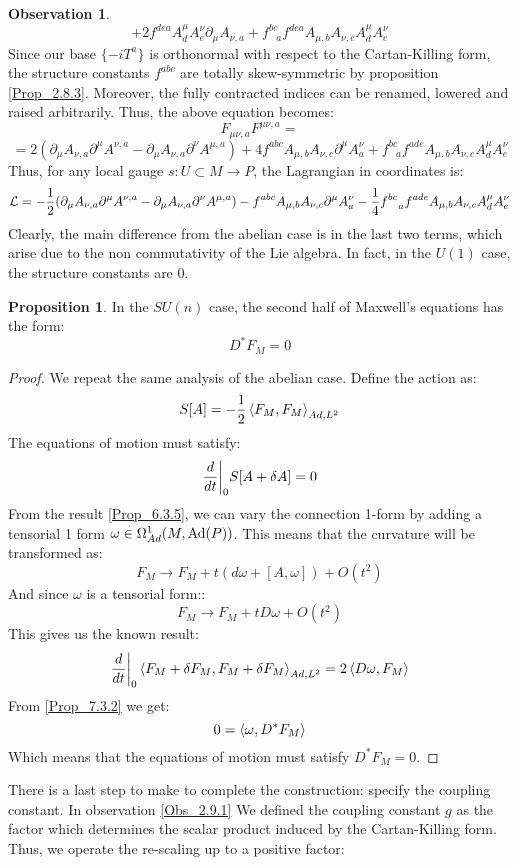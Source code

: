 \documentclass[12pt,a4paper]{report}
\theoremstyle{definition}
\theoremstyle{Theorem}
\newtheorem{Prop}[Def]{Proposition}
\theoremstyle{definition}
\theoremstyle{definition}
\newtheorem{Obs}[Def]{Observation}
\begin{document}
\begin{Obs}
		$$+2f^{dea}A^{\mu}_dA^{\nu}_e\partial_\mu A_{\nu,a}+f^{bc}_{\hspace{9pt}a}f^{dea}A_{\mu,b}A_{\nu,c}A^{\mu}_dA^{\nu}_e$$
		Since our base $\{-iT^a\}$ is orthonormal with respect to the Cartan-Killing form, the structure constants $f^{abc}$ are totally skew-symmetric by proposition \ref{Prop_2.8.3}. Moreover, the fully contracted indices can be renamed, lowered and raised arbitrarily. Thus, the above equation becomes:
		$$F_{\mu\nu,a}F^{\mu\nu,a}=$$
		$$=2(\partial_\mu A_{\nu,a}\partial^\mu A^{\nu,a}-\partial_\mu A_{\nu,a}\partial^\nu A^{\mu,a})+4f^{abc}A_{\mu,b}A_{\nu,c}\partial^\mu A^{\nu}_{a}+ f^{bc}_{\hspace{9pt}a}f^{ade}A_{\mu,b}A_{\nu,c}A^{\mu}_dA^{\nu}_e$$
		Thus, for any local gauge $s:U\subset M\rightarrow P$, the Lagrangian in coordinates is:
		$$\mathcal{L}=-{1\over 2}(\partial_\mu A_{\nu,a}\partial^\mu A^{\nu,a}-\partial_\mu A_{\nu,a}\partial^\nu A^{\mu,a})-f^{abc}A_{\mu,b}A_{\nu,c}\partial^\mu A^{\nu}_{a}-{1\over 4} f^{bc}_{\hspace{9pt}a}f^{ade}A_{\mu,b}A_{\nu,c}A^{\mu}_dA^{\nu}_e$$
		Clearly, the main difference from the abelian case is in the last two terms, which arise due to the non commutativity of the Lie algebra. In fact, in the $U(1)$ case, the structure constants are 0.
	\end{Obs}
	\begin{Prop}
		In the $SU(n)$ case, the second half of Maxwell's equations has the form:
		$$D^*F_M=0$$
	\end{Prop}
	\begin{proof}
		We repeat the same analysis of the abelian case. Define the action as:
		$$S[A]=-{1\over 2}\braket{F_M,F_M}_{Ad,L^2}$$
		The equations of motion must satisfy:
		$${d\over dt}\bigg|_0S[A+\delta A]=0$$
		From the result \ref{Prop_6.3.5}, we can vary the connection 1-form by adding a tensorial 1 form $\omega\in\Omega^1_{Ad}(M,\hbox{Ad}(P))$. This means that the curvature will be transformed as:
		$$F_M\rightarrow F_M+t(d\omega+[A,\omega])+O(t^2)$$
		And since $\omega$ is a tensorial form::
		$$F_M\rightarrow F_M+tD\omega+O(t^2)$$
		This gives us the known result:
		$${d\over dt}\bigg|_0\braket{F_M+\delta F_M,F_M+\delta F_M}_{Ad,L^2}=2\braket{D\omega,F_M}$$
		From \ref{Prop_7.3.2} we get:
		$$0=\braket{\omega,D^*F_M}$$
		Which means that the equations of motion must satisfy $D^*F_M=0$.
	\end{proof}
	There is a last step to make to complete the construction: specify the coupling constant. In observation \ref{Obs_2.9.1} We defined the coupling constant $g$ as the factor which determines the scalar product induced by the Cartan-Killing form. Thus, we operate the re-scaling up to a positive factor:
\end{document}
